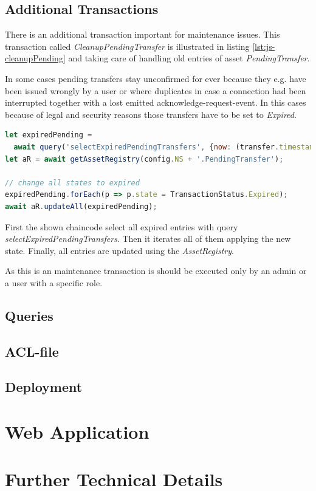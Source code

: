 \subsection{Additional Transactions}

There is an additional transaction important for maintenance issues. This transaction called \textit{CleanupPendingTransfer} is illustrated in listing \ref{lst:js-cleanupPending} and taking care of handling old entries of asset \textit{PendingTransfer}.

In some cases pending transfers stay unconfirmed for ever because they e.g. have been issued wrongly by a user or where duplicates in case a connection had been interrupted together with a lost emitted acknowledge-request-event. In this cases because of legal and security reasons those transfers have to be set to \textit{Expired}.

\begin{center}
\begin{minipage}{0.8\textwidth}
\small
\begin{lstlisting}[language=javascript,firstnumber=1,caption={\bf\small clearDebt JavaScript excerpt}, captionpos=b,label=lst:js-cleanupPending]
let expiredPending =
  await query('selectExpiredPendingTransfers', {now: (transfer.timestamp)});
let aR = await getAssetRegistry(config.NS + '.PendingTransfer');

// change all states to expired
expiredPending.forEach(p => p.state = TransactionStatus.Expired);
await aR.updateAll(expiredPending);
\end{lstlisting}
\end{minipage}
\end{center}

First the shown chaincode select all expired entries with query \textit{selectExpiredPendingTransfers}. Then it iterates all of them applying the new state. Finally, all entries are updated using the \textit{AssetRegistry}.

As this is an maintenance transaction is should be executed only by an admin or a user with a specific role.

\subsection{Queries}
\label{subsec:queries}

\todo{}

\subsection{ACL-file}

\todo{}

\subsection{Deployment}

\todo{}


\section{Web Application}
\label{sec:webapp}


\section{Further Technical Details}
\label{sec:technical-details}

